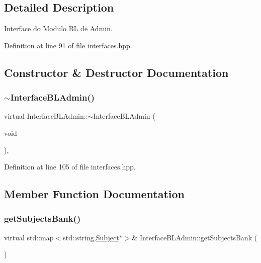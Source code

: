 \subsection{Detailed Description}
Interface do Modulo BL de Admin. 

Definition at line 91 of file interfaces.\+hpp.



\subsection{Constructor \& Destructor Documentation}
\mbox{\label{class_interface_b_l_admin_a4e4c51ea35af8630cb8e5a52f9c021a0}} 
\subsubsection{\texorpdfstring{$\sim$\+Interface\+B\+L\+Admin()}{~InterfaceBLAdmin()}}
{\footnotesize\ttfamily virtual Interface\+B\+L\+Admin\+::$\sim$\+Interface\+B\+L\+Admin (\begin{DoxyParamCaption}\item[{void}]{ }\end{DoxyParamCaption})\hspace{0.3cm}{\ttfamily [inline]}, {\ttfamily [virtual]}}



Definition at line 105 of file interfaces.\+hpp.



\subsection{Member Function Documentation}
\mbox{\label{class_interface_b_l_admin_ace992c81c3ca58363336ff2f7fbbda0b}} 
\subsubsection{\texorpdfstring{get\+Subjects\+Bank()}{getSubjectsBank()}}
{\footnotesize\ttfamily virtual std\+::map$<$std\+::string,\hyperlink{class_subject}{Subject}$\ast$$>$\& Interface\+B\+L\+Admin\+::get\+Subjects\+Bank (\begin{DoxyParamCaption}{ }\end{DoxyParamCaption})\hspace{0.3cm}{\ttfamily [pure virtual]}}



